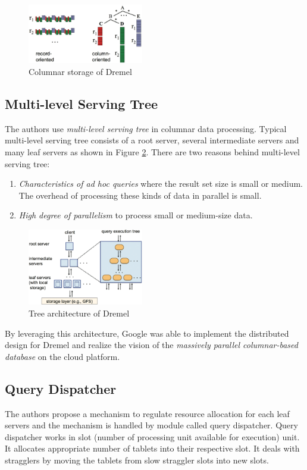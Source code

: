 \documentclass[twocolumn]{article}
\newcommand{\be}{\begin{enumerate}}
\newcommand{\ee}{\end{enumerate}}
\newcommand{\ii}{\item}
\begin{document}
\begin{figure}[htb]
        \centering
        \includegraphics[width=0.45\textwidth]{column-oriented.png}
        \caption{Columnar storage of Dremel}
        \label{fig:column-oriented}
\end{figure}

\subsection{Multi-level Serving Tree}
The authors use \textit{multi-level serving tree} in columnar data processing. Typical multi-level serving tree consists of a root server, several intermediate servers and many leaf servers as shown in Figure \ref{fig:tree}. There are two reasons behind multi-level serving tree:
\be
\ii \textit{Characteristics of ad hoc queries} where the result set size is small or medium. The overhead of processing these kinds of data in parallel is small.
\ii \textit{High degree of parallelism} to process small or medium-size data.
\ee
\begin{figure}[htb]
        \centering
        \includegraphics[width=0.45\textwidth]{query-execution-tree.png}
        \caption{Tree architecture of Dremel}
        \label{fig:tree}
\end{figure}

By leveraging this architecture, Google was able to implement the distributed design for Dremel and realize the vision of the \textit{massively parallel columnar-based database} on the cloud platform.

\subsection{Query Dispatcher}
The authors propose a mechanism to regulate resource allocation for each leaf servers and the mechanism is handled by module called query dispatcher. Query dispatcher works in slot (number of processing unit available for execution) unit. It allocates appropriate number of tablets into their respective slot. It deals with stragglers by moving the tablets from slow straggler slots into new slots.
\end{document}
